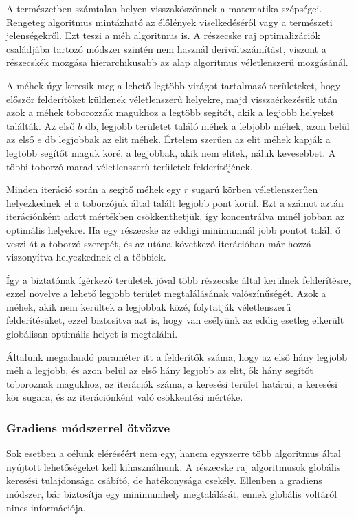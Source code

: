 A természetben számtalan helyen visszaköszönnek a matematika szépségei. Rengeteg algoritmus mintázható az élőlények viselkedéséről vagy a természeti jelenségekről. Ezt teszi a méh algoritmus is. A részecske raj optimalizációk családjába tartozó módszer szintén nem használ deriváltszámítást, viszont a részecskék mozgása hierarchikusabb az alap algoritmus véletlenszerű mozgásánál. 

A méhek úgy keresik meg a lehető legtöbb virágot tartalmazó területeket, hogy először felderítőket küldenek véletlenszerű helyekre, majd visszaérkezésük után azok a méhek toborozzák magukhoz a legtöbb segítőt, akik a legjobb helyeket találták. 
Az első $b$ db, legjobb területet találó méhek a lebjobb méhek, azon belül az első $e$ db legjobbak az elit méhek. Értelem szerűen az elit méhek kapják a legtöbb segítőt maguk köré, a legjobbak, akik nem elitek, náluk kevesebbet. A többi toborzó marad véletlenszerű területek felderítőjének.

Minden iteráció során a segítő méhek egy $r$ sugarú körben véletlenszerűen helyezkednek el a toborzójuk által talált legjobb pont körül. Ezt a számot aztán iterációnként adott mértékben csökkenthetjük, így koncentrálva minél jobban az optimális helyekre. Ha egy részecske az eddigi minimumnál jobb pontot talál, ő veszi át a toborzó szerepét, és az utána következő iterációban már hozzá viszonyítva helyezkednek el a többiek.

Így a biztatónak ígérkező területek jóval több részecske által kerülnek felderítésre, ezzel növelve a lehető legjobb terület megtalálásának valószínűségét. Azok a méhek, akik nem kerültek a legjobbak közé, folytatják véletlenszerű felderítésüket, ezzel biztosítva azt is, hogy van esélyünk az eddig esetleg elkerült globálisan optimális helyet is megtalálni.

Általunk megadandó paraméter itt a felderítők száma, hogy az első hány legjobb méh a legjobb, és azon belül az első hány legjobb az elit, ők hány segítőt toboroznak magukhoz, az iterációk száma, a keresési terület határai, a keresési kör sugara, és az iterációnként való csökkentési mértéke.

\subsubsection{Gradiens módszerrel ötvözve}

Sok esetben a célunk eléréséért nem egy, hanem egyszerre több algoritmus által nyújtott lehetőségeket kell kihasználnunk. A részecske raj algoritmusok globális keresési tulajdonsága csábító, de hatékonysága csekély. Ellenben a gradiens módszer, bár biztosítja egy minimumhely megtalálását, ennek globális voltáról nincs információja.

